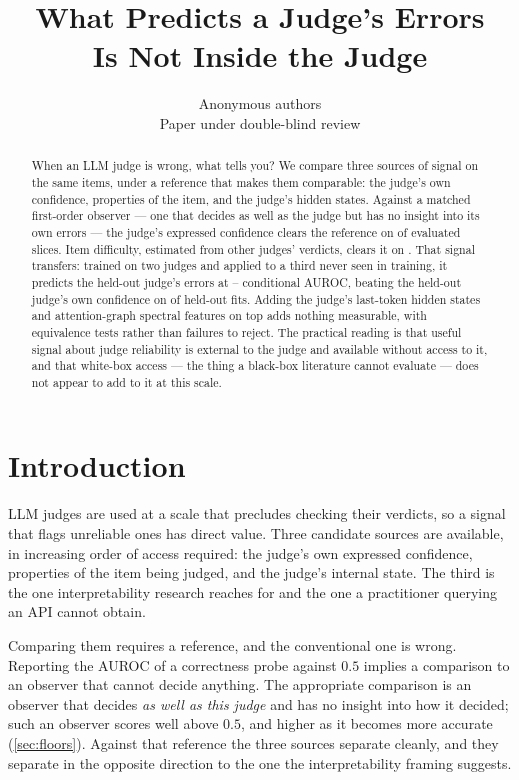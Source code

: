 \documentclass{article}
\title{What Predicts a Judge's Errors\\Is Not Inside the Judge}
\author{Anonymous authors\\Paper under double-blind review}
\begin{document}
\maketitle

\begin{abstract}
When an LLM judge is wrong, what tells you? We compare three sources of signal on the same items,
under a reference that makes them comparable: the judge's own confidence, properties of the item,
and the judge's hidden states. Against a matched first-order observer --- one that decides as well
as the judge but has no insight into its own errors --- the judge's expressed confidence clears the
reference on \NClearConfidence{} of \NSlicesUsable{} evaluated slices. Item difficulty, estimated from other
judges' verdicts, clears it on \NClearBaseline{}. That signal transfers: trained on two judges and
applied to a third never seen in training, it predicts the held-out judge's errors at
\TransferExtLo{}--\TransferExtHi{} conditional AUROC, beating the held-out judge's own confidence on
\TransferExtBeatsMargin{} of \TransferN{} held-out fits. Adding the judge's last-token hidden states
and attention-graph spectral features on top adds nothing measurable, with equivalence tests rather
than failures to reject. The practical reading is that useful signal about judge reliability is
external to the judge and available without access to it, and that white-box access --- the thing a
black-box literature cannot evaluate --- does not appear to add to it at this scale.
\end{abstract}

\section{Introduction}
\label{sec:intro}

LLM judges are used at a scale that precludes checking their verdicts, so a signal that flags
unreliable ones has direct value. Three candidate sources are available, in increasing order of
access required: the judge's own expressed confidence, properties of the item being judged, and the
judge's internal state. The third is the one interpretability research reaches for and the one a
practitioner querying an API cannot obtain.

Comparing them requires a reference, and the conventional one is wrong. Reporting the AUROC of a
correctness probe against $0.5$ implies a comparison to an observer that cannot decide anything. The
appropriate comparison is an observer that decides \emph{as well as this judge} and has no insight
into how it decided; such an observer scores well above $0.5$, and higher as it becomes more
accurate (\cref{sec:floors}). Against that reference the three sources separate cleanly, and they
separate in the opposite direction to the one the interpretability framing suggests.
\end{document}

